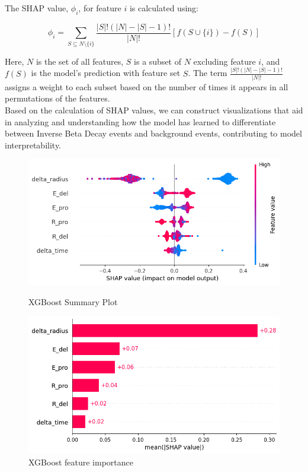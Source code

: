 The SHAP value, \(\phi_i\), for feature \(i\) is calculated using:

\begin{equation}
	\phi_i = \sum_{S \subseteq N \setminus \{i\}} \frac{|S|!(|N| - |S| - 1)!}{|N|!} [f(S \cup \{i\}) - f(S)]
\end{equation}

Here, \(N\) is the set of all features, \(S\) is a subset of \(N\) excluding feature \(i\), and \(f(S)\) is the model's prediction with feature set \(S\). The term \(\frac{|S|!(|N| - |S| - 1)!}{|N|!}\) assigns a weight to each subset based on the number of times it appears in all permutations of the features.\\



Based on the calculation of SHAP values, we can construct visualizations that aid in analyzing and understanding how the model has learned to differentiate between Inverse Beta Decay events and background events, contributing to model interpretability. 

\begin{figure}[h!]
	\centering
	\begin{minipage}{0.5\textwidth}
		\centering
		\includegraphics[width=\linewidth]{Images/Shap/summary_plot}
		\caption{XGBoost Summary Plot}
		\label{fig:summary_plot}
	\end{minipage}%
	\begin{minipage}{0.5\textwidth}
		\centering
		\includegraphics[width=\linewidth]{Images/Shap/feature_importance_bar}
		\caption{XGBoost feature importance}
		\label{fig:feature_importance}
	\end{minipage}
\end{figure}


